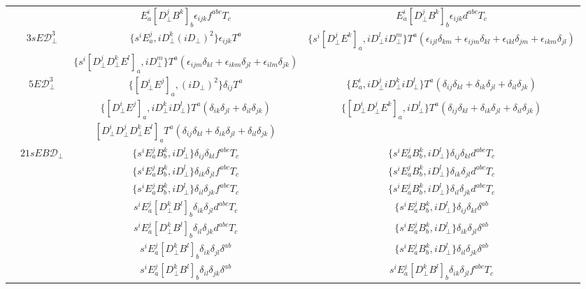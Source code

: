 \documentclass[prd,onecolumn, nofootinbib, 11pt]{revtex4}
\newcommand{\iD}{iD_\perp}
\newcommand{\D}{D_\perp}
\begin{document}
\begin{table}[h!]
{\begin{tabular}{| c | c | c | c |}
										     	        & & $E^i_a [\D^j B^k]_b\epsilon_{ijk}f^{abc}T_c$ & $E^i_a [\D^j B^k]_b\epsilon_{ijk}d^{abc}T_c$ \\ \cline{2-4}
						& \multirow{2}{*}{$3sE \mathcal{D}_\perp^3$} & $\{ s^i E^j_a, \iD^k (\iD)^2 \}\epsilon_{ijk}T^a$ & $\{ s^i [\D^j E^k]_a, \iD^l \iD^m \}T^a(\epsilon_{ijl}\delta_{km} + \epsilon_{ijm}\delta_{kl}+\epsilon_{ikl}\delta_{jm}+\epsilon_{ikm}\delta_{jl})$ \\ 
												     & & $\{ s^i [\D^j \D^k E^l]_a, \iD^m\}T^a(\epsilon_{ijm}\delta_{kl}+\epsilon_{ikm}\delta_{jl}+\epsilon_{ilm}\delta_{jk})$ &  \\ \cline{2-4} 					        											   
						& \multirow{3}{*}{$5E \mathcal{D}_\perp^3$} & $\{ [\D^i E^j]_a, (\iD)^2 \}\delta_{ij}T^a$ & $\{ E^i_a, \iD^j \iD^k \iD^l \}T^a(\delta_{ij}\delta_{kl}+\delta_{ik}\delta_{jl}+\delta_{il}\delta_{jk})$ \\
						  						    & &  $\{ [\D^i E^j]_a, \iD^k \iD^l \}T^a(\delta_{ik}\delta_{jl}+\delta_{il}\delta_{jk})$ & $\{ [\D^i \D^j E^k]_a, \iD^l\}T^a(\delta_{ij}\delta_{kl}+\delta_{ik}\delta_{jl}+\delta_{il}\delta_{jk})$ \\
						  						    & &  $[\D^i \D^j \D^k E^l]_aT^a(\delta_{ij}\delta_{kl}+\delta_{ik}\delta_{jl}+\delta_{il}\delta_{jk})$ &  \\  \cline{2-4} 	
						& \multirow{11}{*}{$21sEB \mathcal{D}_\perp$} & $\{ s^i E^j_a B^k_b, \iD^l\} \delta_{ij} \delta_{kl}f^{abc}T_c $ & $\{ s^i E^j_a B^k_b, \iD^l\} \delta_{ij} \delta_{kl}d^{abc}T_c $ \\	
												     & & $\{ s^i E^j_a B^k_b, \iD^l\} \delta_{ik} \delta_{jl}f^{abc}T_c $ & $\{ s^i E^j_a B^k_b, \iD^l\} \delta_{ik} \delta_{jl} d^{abc}T_c$ \\
												     & & $\{ s^i E^j_a B^k_b, \iD^l\} \delta_{il} \delta_{jk}f^{abc}T_c $ & $\{ s^i E^j_a B^k_b, \iD^l\} \delta_{il} \delta_{jk} d^{abc}T_c$ \\
												     & & $s^i E^j_a [\D^k B^l]_b\delta_{ik}\delta_{jl}d^{abc}T_c$ & $\{ s^i E^j_a B^k_b, \iD^l\} \delta_{ij} \delta_{kl} \delta^{ab}$ \\
												     & & $s^i E^j_a [\D^k B^l]_b\delta_{il}\delta_{jk}d^{abc}T_c$ & $\{ s^i E^j_a B^k_b, \iD^l\} \delta_{ik} \delta_{jl} \delta^{ab}$ \\
												     & & $s^i E^j_a [\D^k B^l]_b\delta_{ik}\delta_{jl}\delta^{ab}$& $\{ s^i E^j_a B^k_b, \iD^l\} \delta_{il} \delta_{jk}\delta^{ab} $ \\
												     & & $s^i E^j_a [\D^k B^l]_b\delta_{il}\delta_{jk}\delta^{ab}$ & $s^i E^j_a [\D^k B^l]_b\delta_{ik}\delta_{jl}f^{abc}T_c$ \\

\end{tabular}}
\end{table}
\end{document}
